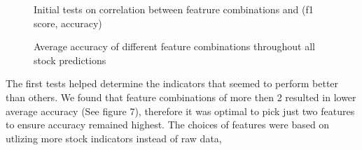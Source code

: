 \documentclass{article}
\begin{document}
\begin{figure}[H]
    \centering
    \caption{Initial tests on correlation between featrure combinations and (f1 score, accuracy)}
    \label{fig:6}
\end{figure}
\noindent
\begin{figure}[H]
    \centering
    \caption{Average accuracy of different feature combinations throughout all stock predictions}
    \label{fig:7}
\end{figure}
\noindent
The first tests helped determine the indicators that seemed to perform better than others. We found that feature combinations of more then 2 resulted in lower average accuracy (See figure 7),
therefore it was optimal to pick just two features to ensure accuracy remained highest. The choices of features were based on utlizing more stock indicators instead of raw data,
\end{document}
